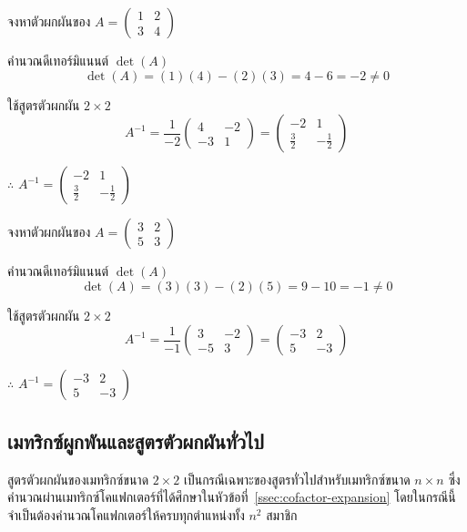\begin{ex}
\label{ex:inverse-2x2}
จงหาตัวผกผันของ $A = \begin{pmatrix} 1 & 2 \\ 3 & 4 \end{pmatrix}$
\end{ex}
\begin{solution}
คำนวณดีเทอร์มิแนนต์ $\det(A)$ \[ \det(A) = (1)(4) - (2)(3) = 4 - 6 = -2 \neq 0 \]

ใช้สูตรตัวผกผัน $2 \times 2$ \[ A^{-1} = \frac{1}{-2}\begin{pmatrix} 4 & -2 \\ -3 & 1 \end{pmatrix} = \begin{pmatrix} -2 & 1 \\ \tfrac{3}{2} & -\tfrac{1}{2} \end{pmatrix} \]

$\therefore$ $A^{-1} = \begin{pmatrix} -2 & 1 \\ \tfrac{3}{2} & -\tfrac{1}{2} \end{pmatrix}$ \solhere
\end{solution}

\begin{ex}
\label{ex:inverse-2x2-det1}
จงหาตัวผกผันของ $A = \begin{pmatrix} 3 & 2 \\ 5 & 3 \end{pmatrix}$
\end{ex}
\begin{solution}
คำนวณดีเทอร์มิแนนต์ $\det(A)$ \[ \det(A) = (3)(3) - (2)(5) = 9 - 10 = -1 \neq 0 \]

ใช้สูตรตัวผกผัน $2 \times 2$ \[ A^{-1} = \frac{1}{-1}\begin{pmatrix} 3 & -2 \\ -5 & 3 \end{pmatrix} = \begin{pmatrix} -3 & 2 \\ 5 & -3 \end{pmatrix} \]

$\therefore$ $A^{-1} = \begin{pmatrix} -3 & 2 \\ 5 & -3 \end{pmatrix}$ \solhere
\end{solution}

\subsection{เมทริกซ์ผูกพันและสูตรตัวผกผันทั่วไป}
\label{ssec:adjugate}
สูตรตัวผกผันของเมทริกซ์ขนาด $2 \times 2$ เป็นกรณีเฉพาะของสูตรทั่วไปสำหรับเมทริกซ์ขนาด $n \times n$ ซึ่งคำนวณผ่านเมทริกซ์โคแฟกเตอร์ที่ได้ศึกษาในหัวข้อที่~\ref{ssec:cofactor-expansion} โดยในกรณีนี้จำเป็นต้องคำนวณโคแฟกเตอร์ให้ครบทุกตำแหน่งทั้ง $n^2$ สมาชิก

